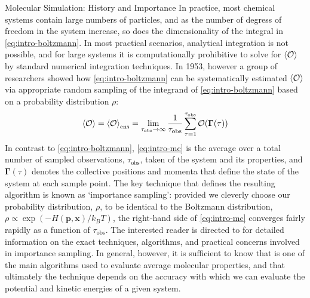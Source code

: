 \begin{section}{Molecular Simulation: History and Importance}
In practice, most chemical systems contain large numbers of particles, and as the
number of degress of freedom in the system increase, so does the
dimensionality of the integral in \cref{eq:intro-boltzmann}. 
In most practical scenarios, analytical integration is not possible, and for
large systems it is
computationally prohibitive to solve for $\braket{\mathcal{O}}$ by standard numerical
integration techniques.
\cite{allen1989computer}
In 1953, however a group of
researchers\cite{Metropolis1953} showed how \cref{eq:intro-boltzmann} can be
systematically estimated
$\braket{\mathcal{O}}$ via appropriate random sampling of the integrand of
\cref{eq:intro-boltzmann} based on a probability distribution $\rho$:
\cite{Harrison2010,allen1989computer}
%
\begin{align}
\label{eq:intro-mc}
\braket{\mathcal{O}} = \braket{\mathcal{O}}_{\text{ens}} 
= \lim_{\tau_{\text{obs}} \to \infty} \frac{1}{\tau_{\text{obs}}}
\sum\limits_{\tau = 1}^{\tau_{\text{obs}}}
\mathcal{O}(\bm{\Gamma}(\tau))
\end{align}
%
In contrast to \cref{eq:intro-boltzmann}, \cref{eq:intro-mc} is the average
over a total number of sampled observations, ${\tau_{\text{obs}}}$, taken of the
system and its properties, 
and $\bm{\Gamma}(\tau)$ denotes the collective positions and
momenta that define the state of the system at each sample point.
The key technique that
defines the resulting \mc algorithm is known as `importance sampling':
provided we cleverly choose our probability distribution, $\rho$, to be
identical to the Boltzmann distribution, $\rho \propto \exp (-H(\bm p, \bm x)/k_BT)$, the
right-hand side of \cref{eq:intro-mc} converges fairly rapidly as a function
of ${\tau_{\text{obs}}}$.  The interested reader is directed to
\citet{allen1989computer} for detailed information on the exact techniques,
algorithms, and practical concerns involved in importance sampling. In
general, however, it is sufficient to know that \mc is one of the main
algorithms used to evaluate average molecular properties,
and that ultimately the \mc technique depends on the accuracy with which we can
evaluate the potential and kinetic energies of a given system.


\end{section}
